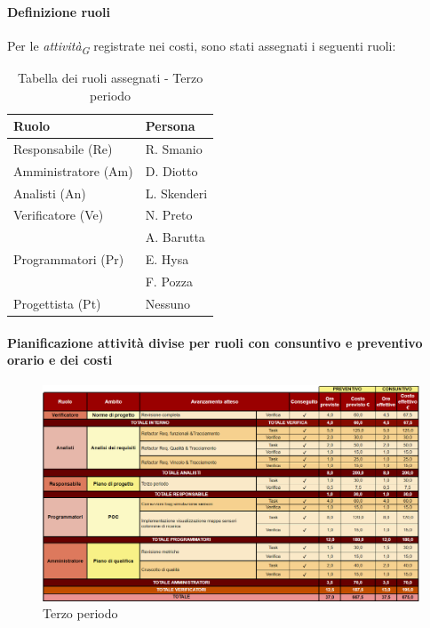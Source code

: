 \paragraph{Definizione ruoli} 
Per le \textit{attività}\textsubscript{\textit{G}} registrate nei costi, sono stati assegnati i seguenti ruoli:  

\vspace{0.4cm}

\begin{table}[H]
    \centering
    \begin{tabular}{|L{4cm}|L{2cm}|}
    \hline
    \textbf{Ruolo} & \textbf{Persona} \\
    \hline
    \hline
    Responsabile (Re)   & R. Smanio \\
    \hline
    Amministratore (Am) & D. Diotto \\
    \hline
    Analisti (An)       & L. Skenderi \\
    \hline
    Verificatore (Ve)   & N. Preto \\
                        & A. Barutta \\
    \hline
    Programmatori (Pr)  & E. Hysa \\
                        & F. Pozza \\
    \hline
    Progettista (Pt)    & Nessuno \\
    \hline
    \end{tabular}
    \caption{Tabella dei ruoli assegnati - Terzo periodo}
    \label{tab:Ruoli_persone_3}
    \end{table}

\newpage
\paragraph{Pianificazione attività divise per ruoli con consuntivo e preventivo orario e dei costi}

\begin{figure}[H]
    \centering
    \includegraphics[width=\linewidth, height=0.9\textheight, keepaspectratio]{../Images/periodo3.PNG}
    \caption{Terzo periodo}
    \label{fig:Terzo_periodo}
\end{figure}

